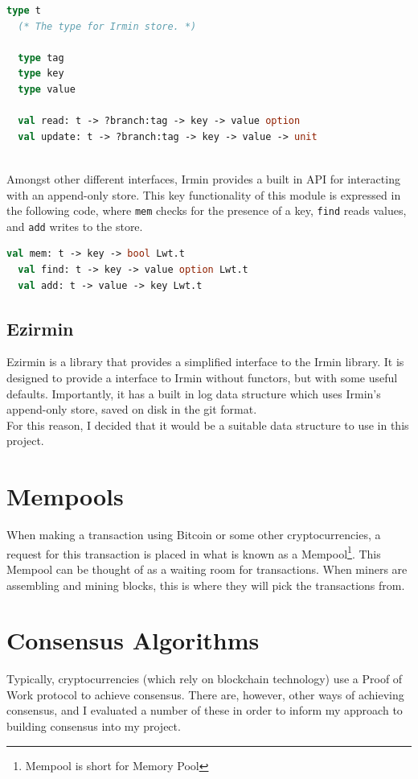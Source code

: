 \documentclass[12pt,a4paper,twoside,openright]{report}
\begin{document}
		\begin{lstlisting}[language=Caml]
  type t
  (* The type for Irmin store. *)

  type tag
  type key 
  type value

  val read: t -> ?branch:tag -> key -> value option
  val update: t -> ?branch:tag -> key -> value -> unit
			
		\end{lstlisting}
		Amongst other different interfaces, Irmin provides a built in API for interacting with an append-only store. This key functionality of this module is expressed in the following code, where \texttt{mem} checks for the presence of a key, \texttt{find} reads values, and \texttt{add} writes to the store.

		\begin{lstlisting}[language=Caml]
  val mem: t -> key -> bool Lwt.t
  val find: t -> key -> value option Lwt.t
  val add: t -> value -> key Lwt.t
		\end{lstlisting}
	\subsection*{Ezirmin}
	Ezirmin is a library that provides a simplified interface to the Irmin library. It is designed to provide a interface to Irmin without functors, but with some useful defaults. Importantly, it has a built in log data structure which uses Irmin's append-only store, saved on disk in the git format.\\
	For this reason, I decided that it would be a suitable data structure to use in this project.
	\section{Mempools}
	When making a transaction using Bitcoin or some other cryptocurrencies, a request for this transaction is placed in what is known as a Mempool\footnote{Mempool is short for Memory Pool}.
	This Mempool can be thought of as a waiting room for transactions. When miners are assembling and mining blocks, this is where they will pick the transactions from.
	
	\section{Consensus Algorithms}
	Typically, cryptocurrencies (which rely on blockchain technology) use a Proof of Work protocol to achieve consensus. 
	There are, however, other ways of achieving consensus, and I evaluated a number of these in order to inform my approach to building consensus into my project. \\ 
\end{document}
